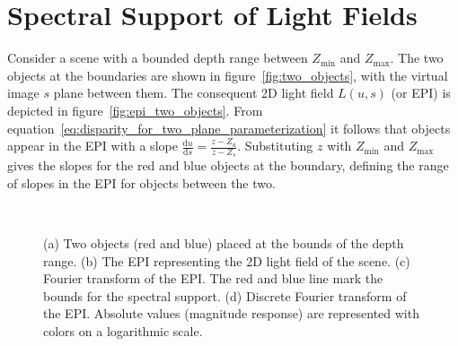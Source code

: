 \section{Spectral Support of Light Fields}
\label{sec:Spectral_Support_for_Light_Field}

Consider a scene with a bounded depth range between $Z_{\text{min}}$ and $Z_{\text{max}}$.
The two objects at the boundaries are shown in figure~\ref{fig:two_objects}, with the virtual image $s$ plane between them.
The consequent 2D light field $L(u, s)$ (or EPI) is depicted in figure~\ref{fig:epi_two_objects}.
From equation~\ref{eq:disparity_for_two_plane_parameterization} it follows that objects appear in the EPI with a slope $\frac{\textrm{d}u}{\textrm{d}s} = \frac{z - Z_u}{z - Z_s}$.
Substituting $z$ with $Z_\text{min}$ and $Z_\text{max}$ gives the slopes for the red and blue objects at the boundary, defining the range of slopes in the EPI for objects between the two.
\begin{figure}[tb]
	\subcaptionbox{\label{fig:two_objects}}{}\hfill%
	\subcaptionbox{\label{fig:epi_two_objects}}{}\hfill%
	\subcaptionbox{\label{fig:epi_fourier_transform_1}}{}
	\\
	\centering
	\caption[Spectral analysis for light fields with bounded depth range]
	{(a) Two objects (red and blue) placed at the bounds of the depth range. 
		(b) The EPI representing the 2D light field of the scene.
		(c) Fourier transform of the EPI. 
		The red and blue line mark the bounds for the spectral support.
		(d) Discrete Fourier transform of the EPI. 
		Absolute values (magnitude response) are represented with colors on a logarithmic scale.}
	\label{fig:spectral_analysis_for_light_field}
\end{figure}


